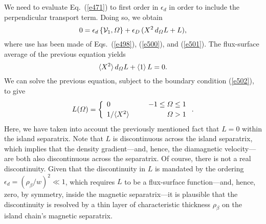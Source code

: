 \documentclass[12pt,prb,aps]{revtex4-1}
\begin{document}
We need to evaluate Eq.~(\ref{e471}) to first order in $\epsilon_d$ in order to include the perpendicular transport term. Doing so,
we obtain
\begin{equation}
0= \epsilon_d\,\{{\cal V}_1, {\mit\Omega}\} + \epsilon_D\,(X^2\,d_{\mit\Omega} L + L),
\end{equation}
where use has been made of Eqs.~(\ref{e498}), (\ref{e500}),  and (\ref{e501}). The flux-surface average of the
previous equation yields
\begin{equation}
\langle X^2\rangle\,d_{\mit\Omega} L +\langle 1\rangle\,L = 0.
\end{equation}
We can solve the previous equation, subject to the boundary condition (\ref{e502}), to give
\begin{equation}\label{e526}
L({\mit\Omega})=\left\{
\begin{array}{llr}
0&&-1\leq {\mit\Omega}\leq 1\\[0.5ex]
1/\langle X^2\rangle&~~&{\mit\Omega}>1
\end{array}\right..
\end{equation}
Here, we have taken into account the previously mentioned fact that $L=0$ within the island separatrix.
Note that $L$ is discontinuous across the island separatrix, which implies that the density gradient---and, hence,
the diamagnetic velocity---are both also discontinuous across the separatrix. Of course, there is not a real
discontinuity. Given that the discontinuity in $L$ is mandated by the ordering $\epsilon_d=(\rho_\beta/w)^2\ll 1$, which
requires $L$ to be a flux-surface function---and, hence, zero, by symmetry, inside the magnetic separatrix---it is plausible that the discontinuity is resolved by a thin layer of characteristic thickness $\rho_\beta$ on the island chain's magnetic 
separatrix.
\end{document}
